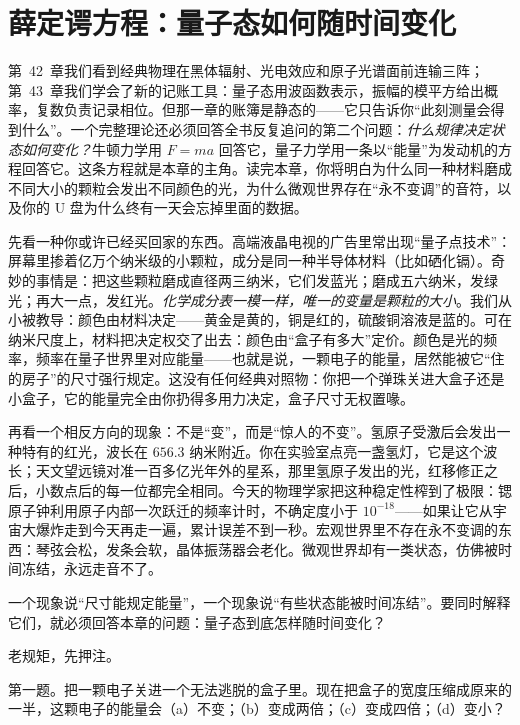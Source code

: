 \chapter{薛定谔方程：量子态如何随时间变化}

第~42~章我们看到经典物理在黑体辐射、光电效应和原子光谱面前连输三阵；第~43~章我们学会了新的记账工具：量子态用波函数表示，振幅的模平方给出概率，复数负责记录相位。但那一章的账簿是静态的——它只告诉你“此刻测量会得到什么”。一个完整理论还必须回答全书反复追问的第二个问题：\emph{什么规律决定状态如何变化？}牛顿力学用 \(F=ma\) 回答它，量子力学用一条以“能量”为发动机的方程回答它。这条方程就是本章的主角。读完本章，你将明白为什么同一种材料磨成不同大小的颗粒会发出不同颜色的光，为什么微观世界存在“永不变调”的音符，以及你的 U 盘为什么终有一天会忘掉里面的数据。


先看一种你或许已经买回家的东西。高端液晶电视的广告里常出现“量子点技术”：屏幕里掺着亿万个纳米级的小颗粒，成分是同一种半导体材料（比如硒化镉）。奇妙的事情是：把这些颗粒磨成直径两三纳米，它们发蓝光；磨成五六纳米，发绿光；再大一点，发红光。\emph{化学成分表一模一样，唯一的变量是颗粒的大小}。我们从小被教导：颜色由材料决定——黄金是黄的，铜是红的，硫酸铜溶液是蓝的。可在纳米尺度上，材料把决定权交了出去：颜色由“盒子有多大”定价。颜色是光的频率，频率在量子世界里对应能量——也就是说，一颗电子的能量，居然能被它“住的房子”的尺寸强行规定。这没有任何经典对照物：你把一个弹珠关进大盒子还是小盒子，它的能量完全由你扔得多用力决定，盒子尺寸无权置喙。

再看一个相反方向的现象：不是“变”，而是“惊人的不变”。氢原子受激后会发出一种特有的红光，波长在 \(656.3\) 纳米附近。你在实验室点亮一盏氢灯，它是这个波长；天文望远镜对准一百多亿光年外的星系，那里氢原子发出的光，红移修正之后，小数点后的每一位都完全相同。今天的物理学家把这种稳定性榨到了极限：锶原子钟利用原子内部一次跃迁的频率计时，不确定度小于 \(10^{-18}\)——如果让它从宇宙大爆炸走到今天再走一遍，累计误差不到一秒。宏观世界里不存在永不变调的东西：琴弦会松，发条会软，晶体振荡器会老化。微观世界却有一类状态，仿佛被时间冻结，永远走音不了。

一个现象说“尺寸能规定能量”，一个现象说“有些状态能被时间冻结”。要同时解释它们，就必须回答本章的问题：量子态到底怎样随时间变化？


老规矩，先押注。

第一题。把一颗电子关进一个无法逃脱的盒子里。现在把盒子的宽度压缩成原来的一半，这颗电子的能量会（a）不变；（b）变成两倍；（c）变成四倍；（d）变小？

